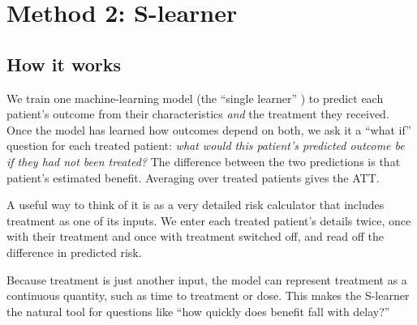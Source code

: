 \section{Method 2: S-learner}

\subsection{How it works}

We train one machine-learning model (the ``single learner'' \cite{kunzel2019}) to predict each patient's outcome from their characteristics \emph{and} the treatment they received. Once the model has learned how outcomes depend on both, we ask it a ``what if'' question for each treated patient: \emph{what would this patient's predicted outcome be if they had not been treated?} The difference between the two predictions is that patient's estimated benefit. Averaging over treated patients gives the ATT.

A useful way to think of it is as a very detailed risk calculator that includes treatment as one of its inputs. We enter each treated patient's details twice, once with their treatment and once with treatment switched off, and read off the difference in predicted risk.

Because treatment is just another input, the model can represent treatment as a continuous quantity, such as time to treatment or dose. This makes the S-learner the natural tool for questions like ``how quickly does benefit fall with delay?''

